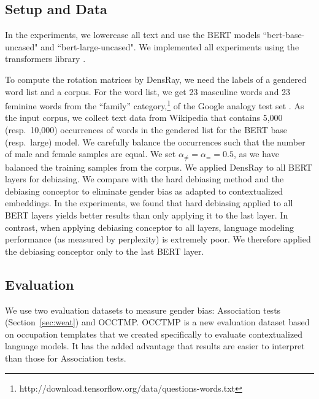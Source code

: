 \subsection{Setup and Data}
In the experiments, we lowercase all text and use the BERT models ``bert-base-uncased" and ``bert-large-uncased". We implemented all experiments using the transformers library \cite{wolf2019huggingfaces}.

To compute the rotation matrices by DensRay, we need the
labels of a gendered word list and a corpus. For the word
list, we get 23 masculine words and 23 feminine words from
the ``family''
category,\footnote{http://download.tensorflow.org/data/questions-words.txt}
of the Google analogy test set \cite{mikolov2013efficient}. As the input corpus, we collect text data from Wikipedia that contains 5,000 (resp.\ 10,000)
occurrences of words in the gendered list for the BERT base
(resp.\ large) model. We carefully balance the occurrences such that the number of male and female samples are equal. We set  $\alpha_{\neq}=\alpha_{=}=0.5$, as we have balanced the training samples from the corpus. 
We applied DensRay to all BERT layers for debiasing. We
compare with the hard debiasing method \cite{mu2018all} and
the debiasing conceptor \cite{karve2019conceptor} to
eliminate gender bias as adapted to contextualized
embeddings. In the experiments, we found that hard debiasing applied to all BERT layers
yields better results than only applying it to the last layer. In contrast, when applying debiasing conceptor
to all layers, language modeling performance (as measured by
perplexity) is extremely poor.
We therefore applied the
debiasing conceptor only to the last BERT layer.

\subsection{Evaluation}
We use two evaluation datasets to measure gender bias: Association tests (Section~\ref{sec:weat}) and OCCTMP. 
OCCTMP is a new evaluation dataset based on occupation templates
that we created specifically to evaluate contextualized language models.  It has the added advantage that results are easier to interpret than those for Association tests.


